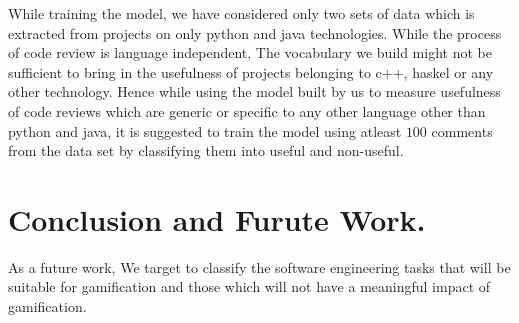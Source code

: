 \documentclass[conference]{IEEEtran}
\begin{document}
While training the model, we have considered only two sets of data which is extracted from projects on only python and java technologies. While the process of code review is language independent, The vocabulary we build might not be sufficient to bring in the usefulness of projects belonging to c++, haskel or any other technology. Hence while using the model built by us to measure usefulness of code reviews which are generic or specific to any other language other than python and java, it is suggested to train the model using atleast $100$ comments from the data set by classifying them into useful and non-useful.



\section{Conclusion and Furute Work.}

As a future work, We target to classify the software engineering tasks that will be suitable for gamification and those which will not have a meaningful impact of gamification.



\end{document}
